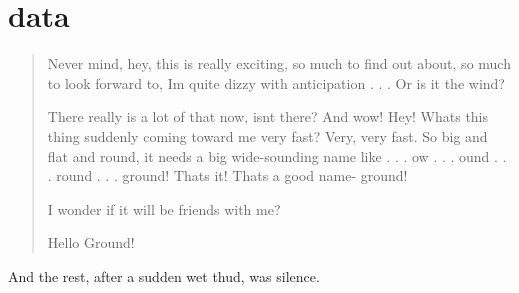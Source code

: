 \chapter{data}
\hypertarget{md__2_users_2hello_2_documents_2_git_hub_2finalproject-engine-drop-table-engines_2_engine_2src_2bc5a83371bb53d7cd617a17a7287ea98}{}\label{md__2_users_2hello_2_documents_2_git_hub_2finalproject-engine-drop-table-engines_2_engine_2src_2bc5a83371bb53d7cd617a17a7287ea98}
\begin{quote}
Never mind, hey, this is really exciting, so much to find out about, so much to look forward to, I\textquotesingle{}m quite dizzy with anticipation . . . Or is it the wind?

There really is a lot of that now, isn\textquotesingle{}t there? And wow! Hey! What\textquotesingle{}s this thing suddenly coming toward me very fast? Very, very fast. So big and flat and round, it needs a big wide-\/sounding name like . . . ow . . . ound . . . round . . . ground! That\textquotesingle{}s it! That\textquotesingle{}s a good name-\/ ground!

I wonder if it will be friends with me?

Hello Ground! \end{quote}
And the rest, after a sudden wet thud, was silence. 